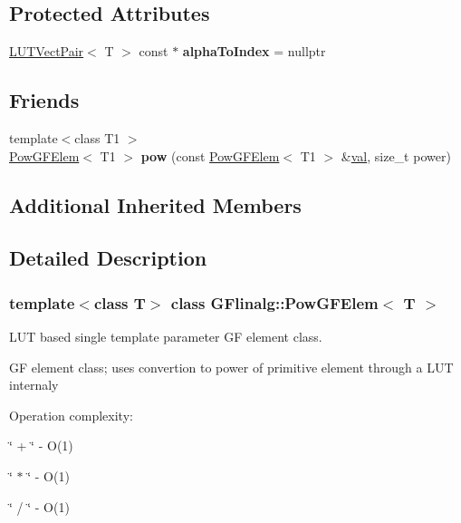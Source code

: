 \subsection*{Protected Attributes}
\begin{DoxyCompactItemize}
\item 
\mbox{\label{class_g_flinalg_1_1_pow_g_f_elem_a20c1aa4bb0a6d3349a79a166e7508151}} 
\mbox{\hyperlink{struct_g_flinalg_1_1op_1_1_l_u_t_vect_pair}{L\+U\+T\+Vect\+Pair}}$<$ T $>$ const  $\ast$ {\bfseries alpha\+To\+Index} = nullptr
\end{DoxyCompactItemize}
\subsection*{Friends}
\begin{DoxyCompactItemize}
\item 
\mbox{\label{class_g_flinalg_1_1_pow_g_f_elem_ae0d65d6e260be7e779a95570b1e6c5d1}} 
{\footnotesize template$<$class T1 $>$ }\\\mbox{\hyperlink{class_g_flinalg_1_1_pow_g_f_elem}{Pow\+G\+F\+Elem}}$<$ T1 $>$ {\bfseries pow} (const \mbox{\hyperlink{class_g_flinalg_1_1_pow_g_f_elem}{Pow\+G\+F\+Elem}}$<$ T1 $>$ \&\mbox{\hyperlink{class_g_flinalg_1_1_basic_g_f_elem_ab8acf4373ba8172d801228d16efcc1d0}{val}}, size\+\_\+t power)
\end{DoxyCompactItemize}
\subsection*{Additional Inherited Members}


\subsection{Detailed Description}
\subsubsection*{template$<$class T$>$\newline
class G\+Flinalg\+::\+Pow\+G\+F\+Elem$<$ T $>$}

L\+UT based single template parameter GF element class. 

GF element class; uses convertion to power of primitive element through a L\+UT internaly

Operation complexity\+:
\begin{DoxyItemize}
\item \char`\"{} + \char`\"{} -\/ O(1)
\item \char`\"{} $\ast$ \char`\"{} -\/ O(1)
\item \char`\"{} / \char`\"{} -\/ O(1)
\end{DoxyItemize}

